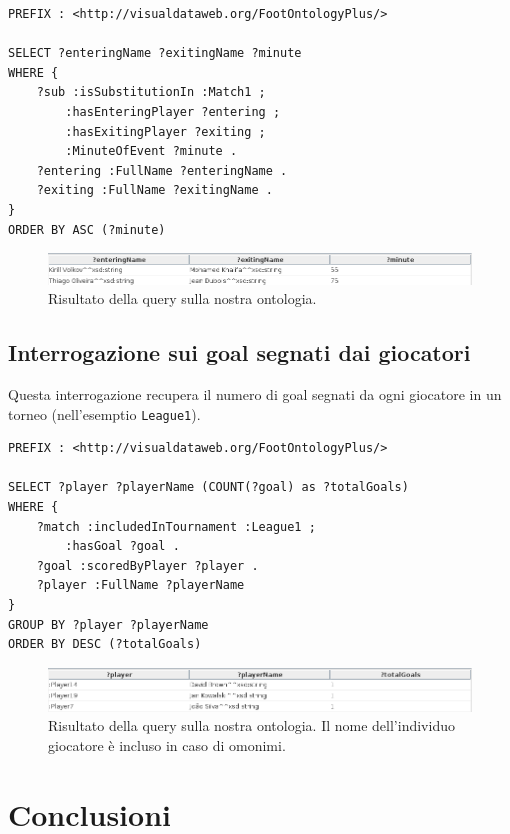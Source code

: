 \documentclass[11pt]{report} %
\begin{document}
\begin{lstlisting}
PREFIX : <http://visualdataweb.org/FootOntologyPlus/>

SELECT ?enteringName ?exitingName ?minute
WHERE {
    ?sub :isSubstitutionIn :Match1 ;
        :hasEnteringPlayer ?entering ;
        :hasExitingPlayer ?exiting ;
        :MinuteOfEvent ?minute .
    ?entering :FullName ?enteringName .
    ?exiting :FullName ?exitingName .
}
ORDER BY ASC (?minute)
\end{lstlisting}

\begin{figure}[H]
	\includegraphics[width=\textwidth]{query4}
	\caption{Risultato della query sulla nostra ontologia.}
\end{figure}

\section{Interrogazione sui goal segnati dai giocatori}

Questa interrogazione recupera il numero di goal segnati da ogni giocatore in un torneo (nell'esemptio \texttt{League1}).

\begin{lstlisting}
PREFIX : <http://visualdataweb.org/FootOntologyPlus/>

SELECT ?player ?playerName (COUNT(?goal) as ?totalGoals) 
WHERE {
    ?match :includedInTournament :League1 ;
        :hasGoal ?goal .
    ?goal :scoredByPlayer ?player .
    ?player :FullName ?playerName
}
GROUP BY ?player ?playerName
ORDER BY DESC (?totalGoals)
\end{lstlisting}

\begin{figure}[H]
	\includegraphics[width=\textwidth]{query5}
	\caption{Risultato della query sulla nostra ontologia. Il nome dell'individuo giocatore è incluso in caso di omonimi.}
\end{figure}



\chapter{Conclusioni}

\medspace

\printbibliography
\end{document}
